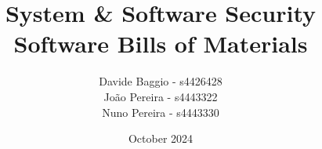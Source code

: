 \documentclass[12pt]{article}
\title{\textbf{System \& Software Security \\ Software Bills of Materials}}
\author{Davide Baggio - s4426428 \\ João Pereira - s4443322 \\ Nuno Pereira - s4443330}
\date{October 2024}
\begin{document}
\begin{titlepage}
    \maketitle
    \thispagestyle{empty}

    \vfill

    \tableofcontents

    \vfill

    
\end{titlepage}








\newpage
\printbibliography
\end{document}
